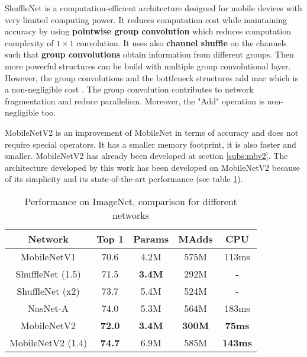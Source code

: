 ShuffleNet \cite{zhang_shufflenet_2018} is a computation-efficient architecture designed for mobile devices with very limited computing power. It reduces computation cost while maintaining accuracy by using \textbf{pointwise group convolution} which reduces computation complexity of $1 \times 1$ convolution. It uses also \textbf{channel shufﬂe} on the channels such that \textbf{group convolutions} obtain information from different groups. Then more powerful structures can be build with multiple group convolutional layer. However, the group convolutions and the bottleneck structures add \acrshort{mac} which is a non-negligible cost \cite{ma_shufflenet_2018}. The group convolution contributes to network fragmentation and reduce parallelism. Moreover, the "Add" operation is non-negligible too.

MobileNetV2 \cite{sandler_mobilenetv2_2019} is an improvement of MobileNet in terms of accuracy and does not require special operators. It has a smaller memory footprint, it is also faster and smaller. MobileNetV2 has already been developed at section \ref{subs:mbv2}. The architecture developed by this work has been developed on MobileNetV2 because of its simplicity and its state-of-the-art performance (see table \ref{tab:mbv2}).
%
\begin{table}
    \center
    \begin{tabular}{ | c | c | c c | c| }
        \hline \hline
        Network & Top 1 & Params & MAdds & CPU \\
        \hline \hline
        MobileNetV1 & 70.6 & 4.2M & 575M & 113ms \\
        ShuffleNet (1.5) & 71.5 & \textbf{3.4M} & 292M & - \\
        ShuffleNet (x2)  & 73.7 & 5.4M & 524M & - \\
        NasNet-A & 74.0 & 5.3M & 564M & 183ms \\
        \hline
        MobileNetV2 & \textbf{72.0} & \textbf{3.4M} & \textbf{300M} & \textbf{75ms} \\
        MobileNetV2 (1.4) & \textbf{74.7} & 6.9M & 585M & \textbf{143ms} \\
        \hline \hline
    \end{tabular}
    \caption{Performance on ImageNet, comparison for different networks \cite{sandler_mobilenetv2_2019}}
    \label{tab:mbv2}
\end{table}
%
%
